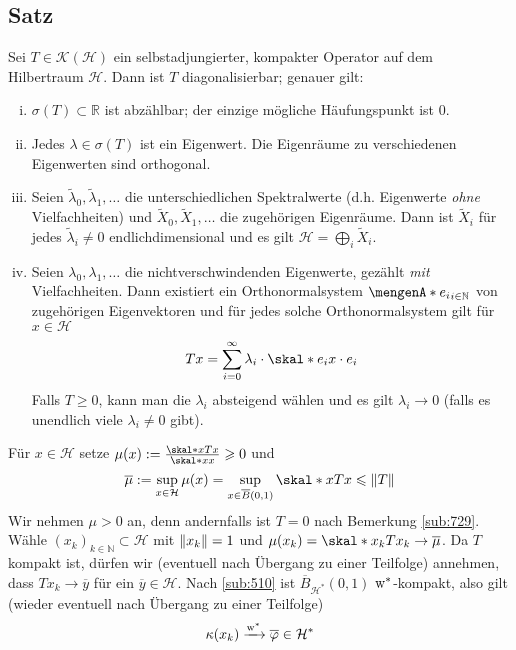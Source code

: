 \subsection[Satz: Diagonalisierbarkeit selbstadjungierter, kompakter Operatoren]{Satz} %
\label{sub:810}
Sei $T \in \mathcal{K}(\mathcal{H})$ ein selbstadjungierter, kompakter Operator auf dem Hilbertraum $\mathcal{H}$. Dann ist $T$ diagonalisierbar; genauer gilt:
\begin{enumerate}[(i)]
	\item $\sigma(T) \subset \mathds{R}$ ist abzählbar; der einzige mögliche Häufungspunkt ist $0$.
	\item Jedes $\lambda \in \sigma(T)$ ist ein Eigenwert. Die Eigenräume zu verschiedenen Eigenwerten sind orthogonal.
	\item Seien $\tilde{\lambda}_0, \tilde{\lambda}_1, \ldots $ die unterschiedlichen Spektralwerte (d.h. Eigenwerte \emph{ohne} Vielfachheiten) und 
	$\tilde{X}_0,\tilde{X}_1,\ldots$ die zugehörigen Eigenräume. Dann ist $\tilde{X}_i$ für jedes $\tilde{\lambda}_i\not=0$ endlichdimensional und es gilt 
	$\mathcal{H}= \bigoplus_i \tilde{X}_i$.
	\item Seien $\lambda_0, \lambda_1,\ldots $ die nichtverschwindenden Eigenwerte, gezählt \emph{mit} Vielfachheiten. Dann existiert ein Orthonormalsystem 
	$\set{e_i}_{i \in \mathds{N}}$ von zugehörigen Eigenvektoren und für jedes solche Orthonormalsystem gilt für $x \in \mathcal{H}$
	\[
		T x = \sum_{i=0}^{\infty} \lambda_i \cdot \skal*{e_i}{x} \cdot e_i 
	\]
	Falls $T\ge 0$, kann man die $\lambda_i$ absteigend wählen und es gilt $\lambda_i \to 0$ (falls es unendlich viele $\lambda_i\not=0$ gibt).
\end{enumerate}
Für $x \in \mathcal{H}$ setze $\mu(x) := \frac{\skal*{x}{T x}}{\skal*{x}{x}}\ge 0$ und 
\[
	\overline{\mu} := \sup_{x \in \mathcal{H}} \mu(x) = \sup_{x \in \overline{B}(0,1)} \skal*{x}{T x} \le \norm{T} 
\]
Wir nehmen $\mu >0$ an, denn andernfalls ist $T=0$ nach Bemerkung \ref{sub:729}. Wähle $(x_k)_{k \in \mathds{N}} \subset \mathcal{H}$ mit $\norm{x_k}=1$ und 
$\mu(x_k)= \skal*{x_k}{T x_k} \to \overline{\mu}$. Da $T$ kompakt ist, dürfen wir (eventuell nach Übergang zu einer Teilfolge) annehmen, dass $T x_k \to \overline{y}$ für
ein $\overline{y}\in \mathcal{H}$.
Nach \ref{sub:510} ist $\overline{B}_{\mathcal{H}^*}(0,1)$ $\mathrm{w}^*$-kompakt, also gilt (wieder eventuell nach Übergang zu einer Teilfolge) 
\[
	\kappa(x_k) \xrightarrow{\mathrm{w}^*} \overline{\varphi} \in \mathcal{H}^*
\]
